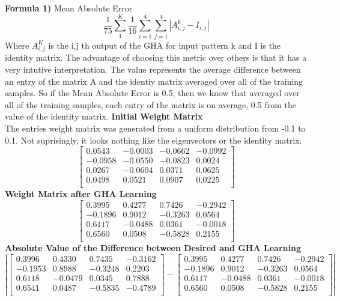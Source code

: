 \documentclass[epsfig]{article}
\begin{document}
\textbf{Formula 1)}
Mean Absolute Error
$$\frac{1}{75} \sum_{1} ^ K \frac{1}{16} \sum_{i=1}^4 \sum_{j = 1}^4 |A^k_{i,j} - I_{i,j}| $$
Where $A_{i,j}^K$ is the i,j th output of the GHA for input pattern k and I is the identity matrix. The advantage of choosing this metric over others is that it has a very intutive interpretation. The value represents the average difference between an entry of the matrix A and the identiy matrix averaged over all of the training samples. So if the Mean Absolute Error is 0.5, then we know that averaged over all of the training samples, each entry of the matrix is on average, 0.5 from the value of the identity matrix.
\newpage
\textbf{Initial Weight Matrix}\\
The entries weight matrix was generated from a uniform distribution from -0.1 to 0.1. Not suprisingly, it looks nothing like the eigenvectors or the identity matrix.
\[
\begin{bmatrix}
    0.0543 &  -0.0003  & -0.0662 &  -0.0992 \\
   -0.0958 &  -0.0550 &  -0.0823 &   0.0024 \\
    0.0267 &  -0.0604  &  0.0371  &  0.0625 \\
    0.0498 &   0.0521  &  0.0907  &  0.0225 \\
\end{bmatrix}
\]
\textbf{Weight Matrix after GHA Learning}
\[
\begin{bmatrix}
    0.3995 &   0.4277 &   0.7426&    -0.2942 \\
   -0.1896 &   0.9012  & -0.3263 &   0.0564 \\
    0.6117 &  -0.0488  &  0.0361&   -0.0018 \\
    0.6560  &  0.0508 &  -0.5828 &   0.2155 \\
\end{bmatrix}
\]
\textbf{Absolute Value of the Difference between Desired and GHA Learning}
\[
\left | \begin{bmatrix}
    0.3996  &  0.4330  &  0.7435 &  -0.3162 \\
   -0.1953  &  0.8988 &  -0.3248  &  0.2203 \\
    0.6118 &  -0.0479   & 0.0345   & 0.7888 \\
    0.6541  &  0.0487 &  -0.5835  & -0.4789 \\
\end{bmatrix} 
-
\begin{bmatrix}
    0.3995 &   0.4277 &   0.7426&    -0.2942 \\
   -0.1896 &   0.9012  & -0.3263 &   0.0564 \\
    0.6117 &  -0.0488  &  0.0361&   -0.0018 \\
    0.6560  &  0.0508 &  -0.5828 &   0.2155 \\
\end{bmatrix}
\right |
\]
\end{document}
